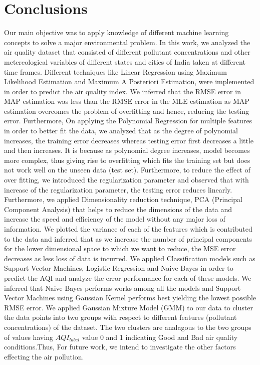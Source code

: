 \documentclass{article}
\begin{document}
\section{Conclusions}
\begin{itemize}
	
Our main objective was to apply knowledge of different machine learning concepts to solve a major environmental problem. In this work, we analyzed the air quality dataset that consisted of different pollutant concentrations and other metereological variables of different states and cities of India taken at different time frames. Different techniques like Linear Regression using Maximum Likelihood Estimation and Maximum A Posteriori Estimation, were implemented  in order to predict the air quality index. We inferred that the RMSE error in MAP estimation was less than the RMSE error in the MLE estimation as MAP estimation overcomes the problem of overfitting and hence, reducing the testing error. Furthermore, On applying the Polynomial Regression for multiple features in order to better fit the data, we analyzed that as the degree  of  polynomial  increases,  the  training error  decreases  whereas  testing  error  first  decreases  a  little  and  then  increases. It  is  because  as polynomial degree increases,  model becomes more complex,  thus giving rise to overfitting which fits the training set but does not work well on the unseen data (test set). Furthermore, to reduce the effect of over fitting, we introduced the regularization parameter and observed that with increase of the regularization parameter, the testing error reduces linearly. Furthermore, we applied Dimensionality reduction technique, PCA (Principal Component Analysis) that helps to reduce the dimensions of the data and increase the speed and efficiency of the model without any major loss of information. We plotted the variance of each of the features which is contributed to the data and inferred that as we increase the number of principal components for the lower dimensional space to which we want to reduce, the MSE error decreases as less loss of data is incurred. We applied Classification models such as Support Vector Machines, Logistic Regression and Naive Bayes in order to predict the AQI and analyze the error performance for each of these models. We inferred that Naive Bayes performs works among all the models and Support Vector Machines using Gaussian Kernel performs best yielding the lowest possible RMSE error. We applied Gaussian Mixture Model (GMM) to our data to cluster the data points into two groups with respect to different features (pollutant concentrations) of the dataset. The two clusters are analagous to the two groups of values having $AQI_{label}$ value 0 and 1 indicating Good and Bad air quality conditions.Thus, For future work, we intend to investigate the other factors effecting the air pollution.
\end{itemize} 
\end{document}
